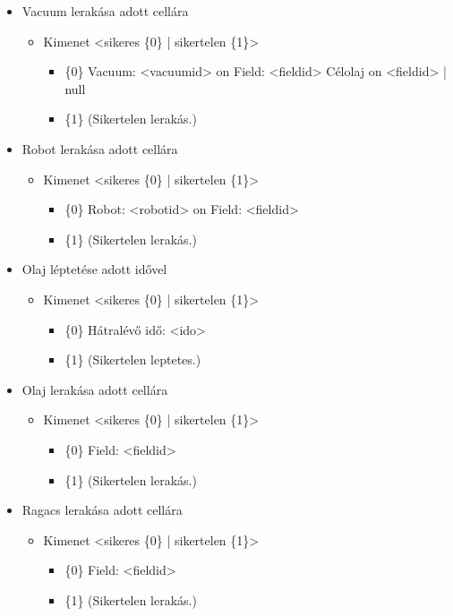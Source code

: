 \begin{itemize}
	\item Vacuum lerakása adott cellára
	\begin{itemize}
		\item Kimenet <sikeres \{0\} | sikertelen \{1\}>
		\begin{itemize}
			\item \{0\} Vacuum: <vacuumid> on Field: <fieldid> Célolaj on {<fieldid> | null}
			\item \{1\} (Sikertelen lerakás.)
		\end{itemize}
	\end{itemize}	
	
	\item Robot lerakása adott cellára
	\begin{itemize}
		\item Kimenet <sikeres \{0\} | sikertelen \{1\}>
		\begin{itemize}
			\item \{0\} Robot: <robotid> on Field: <fieldid> 
			\item \{1\} (Sikertelen lerakás.)
		\end{itemize}
	\end{itemize}	
	
	\item Olaj léptetése adott idővel
	\begin{itemize}
		\item Kimenet <sikeres \{0\} | sikertelen \{1\}>
		\begin{itemize}
			\item \{0\} Hátralévő idő: <ido> 
			\item \{1\} (Sikertelen leptetes.)
		\end{itemize}
	\end{itemize}	
	
	\item Olaj lerakása adott cellára
	\begin{itemize}
		\item Kimenet <sikeres \{0\} | sikertelen \{1\}>
		\begin{itemize}
			\item \{0\} Field: <fieldid> 
			\item \{1\} (Sikertelen lerakás.)
		\end{itemize}
	\end{itemize}	
	
	\item Ragacs lerakása adott cellára
	\begin{itemize}
		\item Kimenet <sikeres \{0\} | sikertelen \{1\}>
		\begin{itemize}
			\item \{0\} Field: <fieldid> 
			\item \{1\} (Sikertelen lerakás.)
		\end{itemize}
	\end{itemize}		
	

\end{itemize}
